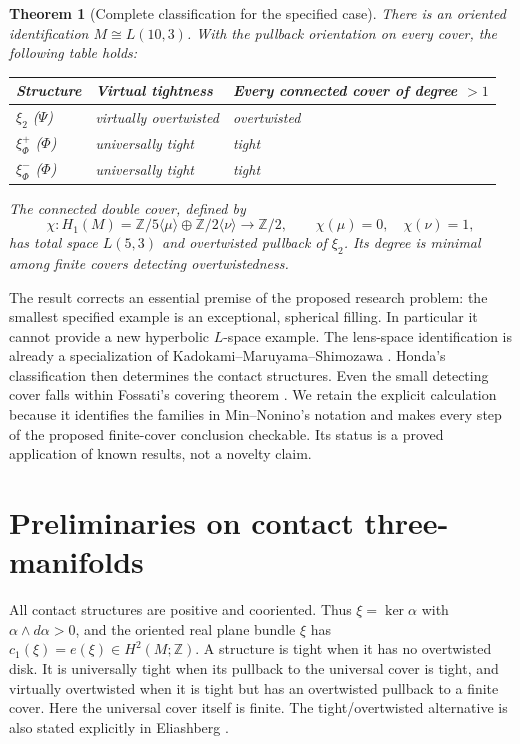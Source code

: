 \documentclass[12pt]{amsart}
\newtheorem{thm}{Theorem}[section]
\theoremstyle{definition}
\theoremstyle{remark}
\numberwithin{equation}{section}
\newcommand{\Z}{\mathbb{Z}}
\theoremstyle{definition}
\begin{document}
\begin{thm}[Complete classification for the specified case]\label{en-main}
There is an oriented identification $M\cong L(10,3)$. With the pullback orientation on every cover, the following table holds:
\begin{center}
\begin{tabular}{lll}\toprule
Structure & Virtual tightness & Every connected cover of degree $>1$\\\midrule
$\xi_2$ ($\Psi$) & virtually overtwisted & overtwisted\\
$\xi_\Phi^+$ ($\Phi$) & universally tight & tight\\
$\xi_\Phi^-$ ($\Phi$) & universally tight & tight\\\bottomrule
\end{tabular}
\end{center}
The connected double cover, defined by
\begin{equation}\label{en-character}
\chi:H_1(M)=\Z/5\langle\mu\rangle\oplus\Z/2\langle\nu\rangle\longrightarrow\Z/2,
\qquad \chi(\mu)=0,\quad\chi(\nu)=1,
\end{equation}
has total space $L(5,3)$ and overtwisted pullback of $\xi_2$. Its degree is minimal among finite covers detecting overtwistedness.
\end{thm}

The result corrects an essential premise of the proposed research problem: the smallest specified example is an exceptional, spherical filling. In particular it cannot provide a new hyperbolic $L$-space example. The lens-space identification is already a specialization of Kadokami--\allowbreak Maruyama--\allowbreak Shimozawa \cite[Theorem 1.2(B)(5)]{en-KMS}. Honda's classification \cite{en-Honda} then determines the contact structures. Even the small detecting cover falls within Fossati's covering theorem \cite[Theorem 5]{en-Fossati}. We retain the explicit calculation because it identifies the families in Min--Nonino's notation and makes every step of the proposed finite-cover conclusion checkable. Its status is a proved application of known results, not a novelty claim.

\section{Preliminaries on contact three-manifolds}\label{en-prelim}
All contact structures are positive and cooriented. Thus $\xi=\ker\alpha$ with $\alpha\wedge d\alpha>0$, and the oriented real plane bundle $\xi$ has $c_1(\xi)=e(\xi)\in H^2(M;\Z)$. A structure is tight when it has no overtwisted disk. It is universally tight when its pullback to the universal cover is tight, and virtually overtwisted when it is tight but has an overtwisted pullback to a finite cover. Here the universal cover itself is finite. The tight/overtwisted alternative is also stated explicitly in Eliashberg \cite[Theorem 1.4.1]{en-Eliashberg}.
\end{document}
